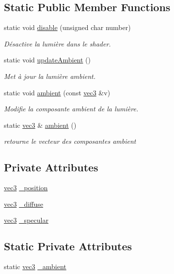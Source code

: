 \subsection*{Static Public Member Functions}
\begin{DoxyCompactItemize}
\item 
static void \hyperlink{class_light_a33a43afc95ed75a8970f523cb3f800fa}{disable} (unsigned char number)
\begin{DoxyCompactList}\small\item\em Désactive la lumière dans le shader. \end{DoxyCompactList}\item 
static void \hyperlink{class_light_a53ce58fd783207da18aa7dc3465841ac}{update\+Ambient} ()
\begin{DoxyCompactList}\small\item\em Met à jour la lumière ambient. \end{DoxyCompactList}\item 
static void \hyperlink{class_light_a1eae781d5e7a95c9dcc9bd76838496df}{ambient} (const \hyperlink{structvec3}{vec3} \&v)
\begin{DoxyCompactList}\small\item\em Modifie la composante ambient de la lumière. \end{DoxyCompactList}\item 
static \hyperlink{structvec3}{vec3} \& \hyperlink{class_light_a4f9a64ec04c9854d02a67cd2ceb6760c}{ambient} ()
\begin{DoxyCompactList}\small\item\em retourne le vecteur des composantes ambient \end{DoxyCompactList}\end{DoxyCompactItemize}
\subsection*{Private Attributes}
\begin{DoxyCompactItemize}
\item 
\hyperlink{structvec3}{vec3} \hyperlink{class_light_a3af8c823a869606782bd9e1872586b72}{\+\_\+position}
\item 
\hyperlink{structvec3}{vec3} \hyperlink{class_light_a32445f2054766ef532c29eb514b2599d}{\+\_\+diffuse}
\item 
\hyperlink{structvec3}{vec3} \hyperlink{class_light_a36414dc1e8a75b36652bc5a12b2ea43d}{\+\_\+specular}
\end{DoxyCompactItemize}
\subsection*{Static Private Attributes}
\begin{DoxyCompactItemize}
\item 
static \hyperlink{structvec3}{vec3} \hyperlink{class_light_ab139b739498b75944c99203027332ad9}{\+\_\+ambient}
\end{DoxyCompactItemize}



